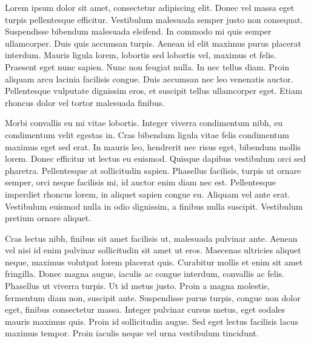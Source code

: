 Lorem ipsum dolor sit amet, consectetur adipiscing elit. Donec vel massa eget turpis pellentesque efficitur. Vestibulum malesuada semper justo non consequat. Suspendisse bibendum malesuada eleifend. In commodo mi quis semper ullamcorper. Duis quis accumsan turpis. Aenean id elit maximus purus placerat interdum. Mauris ligula lorem, lobortis sed lobortis vel, maximus et felis. Praesent eget nunc sapien. Nunc non feugiat nulla. In nec tellus diam. Proin aliquam arcu lacinia facilisis congue. Duis accumsan nec leo venenatis auctor. Pellentesque vulputate dignissim eros, et suscipit tellus ullamcorper eget. Etiam rhoncus dolor vel tortor malesuada finibus.

Morbi convallis eu mi vitae lobortis. Integer viverra condimentum nibh, eu condimentum velit egestas in. Cras bibendum ligula vitae felis condimentum maximus eget sed erat. In mauris leo, hendrerit nec risus eget, bibendum mollis lorem. Donec efficitur ut lectus eu euismod. Quisque dapibus vestibulum orci sed pharetra. Pellentesque at sollicitudin sapien. Phasellus facilisis, turpis ut ornare semper, orci neque facilisis mi, id auctor enim diam nec est. Pellentesque imperdiet rhoncus lorem, in aliquet sapien congue eu. Aliquam vel ante erat. Vestibulum euismod nulla in odio dignissim, a finibus nulla suscipit. Vestibulum pretium ornare aliquet.

Cras lectus nibh, finibus sit amet facilisis ut, malesuada pulvinar ante. Aenean vel nisi id enim pulvinar sollicitudin sit amet ut eros. Maecenas ultricies aliquet neque, maximus volutpat lorem placerat quis. Curabitur mollis et enim sit amet fringilla. Donec magna augue, iaculis ac congue interdum, convallis ac felis. Phasellus ut viverra turpis. Ut id metus justo. Proin a magna molestie, fermentum diam non, suscipit ante. Suspendisse purus turpis, congue non dolor eget, finibus consectetur massa. Integer pulvinar cursus metus, eget sodales mauris maximus quis. Proin id sollicitudin augue. Sed eget lectus facilisis lacus maximus tempor. Proin iaculis neque vel urna vestibulum tincidunt.